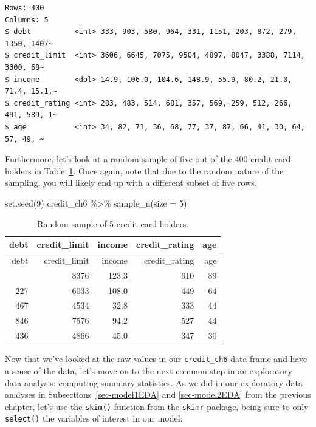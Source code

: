 \documentclass[
  letterpaper,
  DIV=11,
  numbers=noendperiod]{scrreprt}
\newenvironment{Shaded}{\begin{snugshade}}{\end{snugshade}}
\newcommand{\AttributeTok}[1]{\textcolor[rgb]{0.40,0.45,0.13}{#1}}
\newcommand{\DecValTok}[1]{\textcolor[rgb]{0.68,0.00,0.00}{#1}}
\newcommand{\FunctionTok}[1]{\textcolor[rgb]{0.28,0.35,0.67}{#1}}
\newcommand{\NormalTok}[1]{\textcolor[rgb]{0.00,0.23,0.31}{#1}}
\newcommand{\SpecialCharTok}[1]{\textcolor[rgb]{0.37,0.37,0.37}{#1}}
\theoremstyle{definition}
\theoremstyle{remark}
\begin{document}
\begin{verbatim}
Rows: 400
Columns: 5
$ debt          <int> 333, 903, 580, 964, 331, 1151, 203, 872, 279, 1350, 1407~
$ credit_limit  <int> 3606, 6645, 7075, 9504, 4897, 8047, 3388, 7114, 3300, 68~
$ income        <dbl> 14.9, 106.0, 104.6, 148.9, 55.9, 80.2, 21.0, 71.4, 15.1,~
$ credit_rating <int> 283, 483, 514, 681, 357, 569, 259, 512, 266, 491, 589, 1~
$ age           <int> 34, 82, 71, 36, 68, 77, 37, 87, 66, 41, 30, 64, 57, 49, ~
\end{verbatim}

Furthermore, let's look at a random sample of five out of the 400 credit
card holders in Table~\ref{tbl-model3-data-preview}. Once again, note
that due to the random nature of the sampling, you will likely end up
with a different subset of five rows.

\begin{Shaded}
\begin{Highlighting}[]
\FunctionTok{set.seed}\NormalTok{(}\DecValTok{9}\NormalTok{)}
\NormalTok{credit\_ch6 }\SpecialCharTok{\%\textgreater{}\%}
  \FunctionTok{sample\_n}\NormalTok{(}\AttributeTok{size =} \DecValTok{5}\NormalTok{)}
\end{Highlighting}
\end{Shaded}

\hypertarget{tbl-model3-data-preview}{}
\begin{longtable}[]{@{}rrrrr@{}}
\caption{\label{tbl-model3-data-preview}Random sample of 5 credit card
holders.}\tabularnewline
\toprule\noalign{}
debt & credit\_limit & income & credit\_rating & age \\
\midrule\noalign{}
\endfirsthead
\toprule\noalign{}
debt & credit\_limit & income & credit\_rating & age \\
\midrule\noalign{}
\endhead
\bottomrule\noalign{}
\endlastfoot
1259 & 8376 & 123.3 & 610 & 89 \\
227 & 6033 & 108.0 & 449 & 64 \\
467 & 4534 & 32.8 & 333 & 44 \\
846 & 7576 & 94.2 & 527 & 44 \\
436 & 4866 & 45.0 & 347 & 30 \\
\end{longtable}

Now that we've looked at the raw values in our \texttt{credit\_ch6} data
frame and have a sense of the data, let's move on to the next common
step in an exploratory data analysis: computing summary statistics. As
we did in our exploratory data analyses in
Subsections~\ref{sec-model1EDA} and \ref{sec-model2EDA} from the
previous chapter, let's use the \texttt{skim()} function from the
\texttt{skimr} package, being sure to only \texttt{select()} the
variables of interest in our model:
\end{document}
